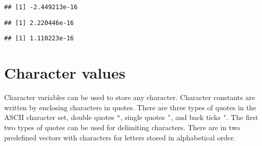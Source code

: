 \documentclass[paper=a4,10pt,div=17,headsepline,BCOR=12mm,twoside,open=right]{scrbook}\usepackage{knitr}
\begin{document}
\begin{knitrout}
\begin{kframe}
\begin{verbatim}
## [1] -2.449213e-16
\end{verbatim}
\begin{alltt}
\hlopt{$} 
\end{alltt}
\begin{verbatim}
## [1] 2.220446e-16
\end{verbatim}
\begin{alltt}
\hlopt{$}
\end{alltt}
\begin{verbatim}
## [1] 1.110223e-16
\end{verbatim}
\end{kframe}
\end{knitrout}

\section{Character values}

Character variables can be used to store any character. Character constants are written by enclosing characters in quotes. There are three types of quotes in the ASCII character set, double quotes \texttt{"}, single quotes \texttt{'}, and back ticks \texttt{`}. The first two types of quotes can be used for delimiting characters. There are in \R two predefined vectors with characters for letters stored in alphabetical order. 
\end{document}
